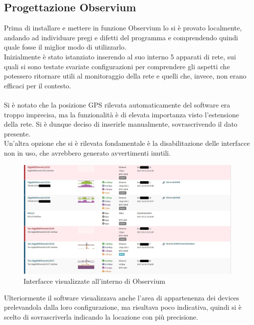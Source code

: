\documentclass[Realizzazione.tex]{subfiles}
\begin{document}
\subsection{Progettazione Observium}
Prima di installare e mettere in funzione Observium lo si è provato localmente, andando ad individuare pregi e difetti del programma e comprendendo quindi quale fosse il miglior modo di utilizzarlo.\\
Inizialmente è stato istanziato inserendo al suo interno 5 apparati di rete, sui quali si sono testate svariate configurazioni per comprendere gli aspetti che potessero ritornare utili al monitoraggio della rete e quelli che, invece, non erano efficaci per il contesto.\\\\
Si è notato che la posizione GPS rilevata automaticamente del software era troppo imprecisa, ma la funzionalità è di elevata importanza visto l'estensione della rete. Si è dunque deciso di inserirle manualmente, sovrascrivendo il dato presente. \\
Un'altra opzione che si è rilevata fondamentale è la disabilitazione delle interfacce non in uso, che avrebbero generato avvertimenti inutili. \\
\begin{figure}[H]
	\centering
	\includegraphics[width=1\linewidth]{"images/Observium_porte"}
	\caption{Interfacce visualizzate all'interno di Observium}
	\label{fig:Interfacce visualizzate all'interno di Observium}
\end{figure}
Ulteriormente il software visualizzava anche l'area di appartenenza dei devices prelevandola dalla loro configurazione, ma risultava poco indicativa, quindi si è scelto di sovrascriverla indicando la locazione con più precisione.
\end{document}
